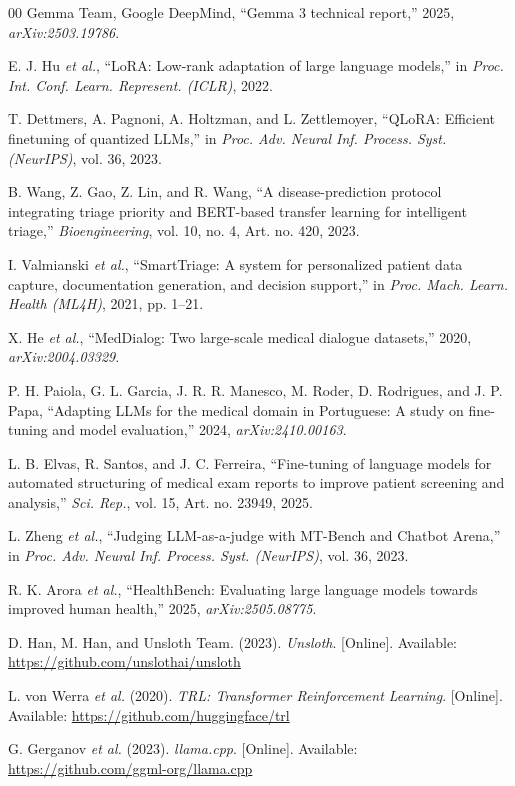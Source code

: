 \documentclass{ieeeaccess}
\begin{document}
\begin{thebibliography}{00}
 Gemma Team, Google DeepMind, ``Gemma 3 technical report,'' 2025, \emph{arXiv:2503.19786}.

 E. J. Hu \emph{et al.}, ``LoRA: Low-rank adaptation of large language models,'' in \emph{Proc. Int. Conf. Learn. Represent. (ICLR)}, 2022.

 T. Dettmers, A. Pagnoni, A. Holtzman, and L. Zettlemoyer, ``QLoRA: Efficient finetuning of quantized LLMs,'' in \emph{Proc. Adv. Neural Inf. Process. Syst. (NeurIPS)}, vol. 36, 2023.

 B. Wang, Z. Gao, Z. Lin, and R. Wang, ``A disease-prediction protocol integrating triage priority and BERT-based transfer learning for intelligent triage,'' \emph{Bioengineering}, vol. 10, no. 4, Art. no. 420, 2023.

 I. Valmianski \emph{et al.}, ``SmartTriage: A system for personalized patient data capture, documentation generation, and decision support,'' in \emph{Proc. Mach. Learn. Health (ML4H)}, 2021, pp. 1--21.

 X. He \emph{et al.}, ``MedDialog: Two large-scale medical dialogue datasets,'' 2020, \emph{arXiv:2004.03329}.

 P. H. Paiola, G. L. Garcia, J. R. R. Manesco, M. Roder, D. Rodrigues, and J. P. Papa, ``Adapting LLMs for the medical domain in Portuguese: A study on fine-tuning and model evaluation,'' 2024, \emph{arXiv:2410.00163}.

 L. B. Elvas, R. Santos, and J. C. Ferreira, ``Fine-tuning of language models for automated structuring of medical exam reports to improve patient screening and analysis,'' \emph{Sci. Rep.}, vol. 15, Art. no. 23949, 2025.

 L. Zheng \emph{et al.}, ``Judging LLM-as-a-judge with MT-Bench and Chatbot Arena,'' in \emph{Proc. Adv. Neural Inf. Process. Syst. (NeurIPS)}, vol. 36, 2023.

 R. K. Arora \emph{et al.}, ``HealthBench: Evaluating large language models towards improved human health,'' 2025, \emph{arXiv:2505.08775}.

 D. Han, M. Han, and Unsloth Team. (2023). \emph{Unsloth}. [Online]. Available: \url{https://github.com/unslothai/unsloth}

 L. von Werra \emph{et al.} (2020). \emph{TRL: Transformer Reinforcement Learning}. [Online]. Available: \url{https://github.com/huggingface/trl}

 G. Gerganov \emph{et al.} (2023). \emph{llama.cpp}. [Online]. Available: \url{https://github.com/ggml-org/llama.cpp}

\end{thebibliography}
\end{document}
